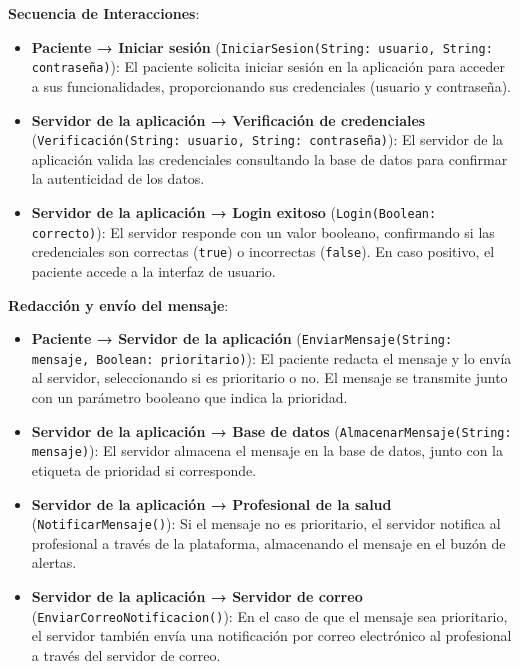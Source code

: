 \documentclass{article}
\begin{document}
\textbf{Secuencia de Interacciones}:
\begin{itemize}
	\item \textbf{Paciente → Iniciar sesión} (\texttt{IniciarSesion(String: usuario, String: contraseña)}): El paciente solicita iniciar sesión en la aplicación para acceder a sus funcionalidades, proporcionando sus credenciales (usuario y contraseña).
	\item \textbf{Servidor de la aplicación → Verificación de credenciales} (\texttt{Verificación(String: usuario, String: contraseña)}): El servidor de la aplicación valida las credenciales consultando la base de datos para confirmar la autenticidad de los datos.
	\item \textbf{Servidor de la aplicación → Login exitoso} (\texttt{Login(Boolean: correcto)}): El servidor responde con un valor booleano, confirmando si las credenciales son correctas (\texttt{true}) o incorrectas (\texttt{false}). En caso positivo, el paciente accede a la interfaz de usuario.
\end{itemize}

\textbf{Redacción y envío del mensaje}:
\begin{itemize}
	\item \textbf{Paciente → Servidor de la aplicación} (\texttt{EnviarMensaje(String: mensaje, Boolean: prioritario)}): El paciente redacta el mensaje y lo envía al servidor, seleccionando si es prioritario o no. El mensaje se transmite junto con un parámetro booleano que indica la prioridad.
	\item \textbf{Servidor de la aplicación → Base de datos} (\texttt{AlmacenarMensaje(String: mensaje)}): El servidor almacena el mensaje en la base de datos, junto con la etiqueta de prioridad si corresponde.
	\item \textbf{Servidor de la aplicación → Profesional de la salud} (\texttt{NotificarMensaje()}): Si el mensaje no es prioritario, el servidor notifica al profesional a través de la plataforma, almacenando el mensaje en el buzón de alertas.
	\item \textbf{Servidor de la aplicación → Servidor de correo} (\texttt{EnviarCorreoNotificacion()}): En el caso de que el mensaje sea prioritario, el servidor también envía una notificación por correo electrónico al profesional a través del servidor de correo.
\end{itemize}
\end{document}
